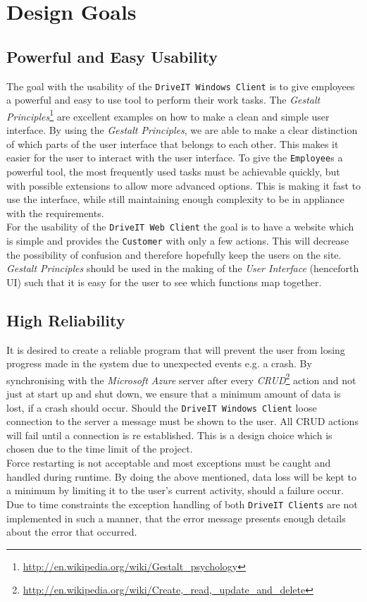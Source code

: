 \section{Design Goals}
\subsection{Powerful and Easy Usability}
The goal with the usability of the \texttt{DriveIT Windows Client} is to give employees a powerful and easy to use tool to perform their work tasks. The \textit{Gestalt Principles}\footnote{\url{http://en.wikipedia.org/wiki/Gestalt_psychology}} are excellent examples on how to make a clean and simple user interface. By using the \textit{Gestalt Principles}, we are able to make a clear distinction of which parts of the user interface that belongs to each other. This makes it easier for the user to interact with the user interface. To give the \texttt{Employee}s a powerful tool, the most frequently used tasks must be achievable quickly, but with possible extensions to allow more advanced options. This is making it fast to use the interface, while still maintaining enough complexity to be in appliance with the requirements.\\

For the usability of the \texttt{DriveIT Web Client} the goal is to have a website which is simple and provides the \texttt{Customer} with only a few actions. This will decrease the possibility of confusion and therefore hopefully keep the users on the site. \textit{Gestalt Principles} should be used in the making of the \textit{User Interface} (henceforth UI) such that it is easy for the user to see which functions map together.

\subsection{High Reliability} It is desired to create a reliable program that will prevent the user from losing progress made in the system due to unexpected events e.g. a crash. By synchronising with the \textit{Microsoft Azure} server after every \textit{CRUD}\footnote{\url{http://en.wikipedia.org/wiki/Create,_read,_update_and_delete}} action and not just at start up and shut down, we ensure that a minimum amount of data is lost, if a crash should occur. Should the \texttt{DriveIT Windows Client} loose connection to the server a message must be shown to the user. All CRUD actions will fail until a connection is re established. This is a design choice which is chosen due to the time limit of the project. \\
Force restarting is not acceptable and most exceptions must be caught and handled during runtime. By doing the above mentioned, data loss will be kept to a minimum by limiting it to the user's current activity, should a failure occur. Due to time constraints the exception handling of both \texttt{DriveIT Clients} are not implemented in such a manner, that the error message presents enough details about the error that occurred.

